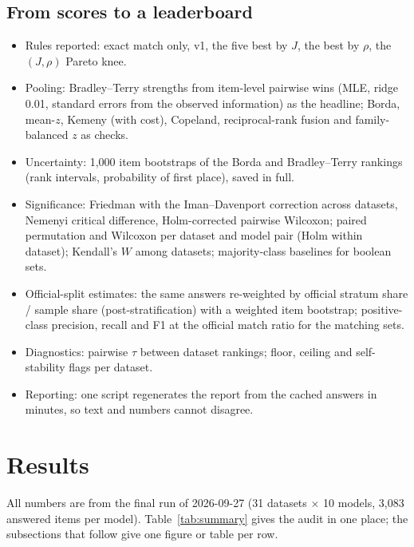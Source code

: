 \documentclass[11pt]{article}
\begin{document}
\subsection{From scores to a leaderboard}
\label{sec:setup:official}
\begin{itemize}
\item Rules reported: exact match only, v1, the five best by $J$, the best by $\rho$, the $(J,\rho)$ Pareto knee.
\item Pooling: Bradley--Terry strengths from item-level pairwise wins (MLE, ridge 0.01, standard errors from the observed information) as the headline; Borda, mean-$z$, Kemeny (with cost), Copeland, reciprocal-rank fusion and family-balanced $z$ as checks.
\item Uncertainty: 1,000 item bootstraps of the Borda and Bradley--Terry rankings (rank intervals, probability of first place), saved in full.
\item Significance: Friedman with the Iman--Davenport correction across datasets, Nemenyi critical difference, Holm-corrected pairwise Wilcoxon; paired permutation and Wilcoxon per dataset and model pair (Holm within dataset); Kendall's $W$ among datasets; majority-class baselines for boolean sets.
\item Official-split estimates: the same answers re-weighted by official stratum share / sample share (post-stratification) with a weighted item bootstrap; positive-class precision, recall and F1 at the official match ratio for the matching sets.
\item Diagnostics: pairwise $\tau$ between dataset rankings; floor, ceiling and self-stability flags per dataset.
\item Reporting: one script regenerates the report from the cached answers in minutes, so text and numbers cannot disagree.
\end{itemize}


\section{Results}
\label{sec:results}

All numbers are from the final run of 2026-09-27 (31 datasets $\times$ 10 models, 3,083 answered items per model). Table~\ref{tab:summary} gives the audit in one place; the subsections that follow give one figure or table per row.
\end{document}
